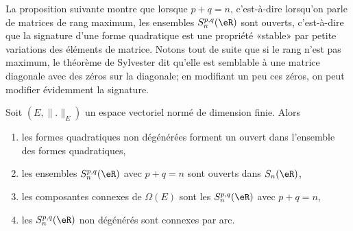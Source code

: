 La proposition suivante montre que lorsque \( p+q=n\), c'est-à-dire lorsqu'on parle de matrices de rang maximum, les ensembles \( S_n^{p,q}(\eR)\) sont ouverts, c'est-à-dire que la signature d'une forme quadratique est une propriété «stable» par petite variations des éléments de matrice. Notons tout de suite que si le rang n'est pas maximum, le théorème de Sylvester dit qu'elle est semblable à une matrice diagonale avec des zéros sur la diagonale; en modifiant un peu ces zéros, on peut modifier évidemment la signature.
\begin{proposition} \label{PropNPbnsMd}
    Soit \( (E,\| . \|_{E})\) un espace vectoriel normé de dimension finie. Alors
    \begin{enumerate}
        \item
            les formes quadratiques non dégénérées forment un ouvert dans l'ensemble des formes quadratiques,
        \item
            les ensembles \( S_n^{p,q}(\eR)\) avec \( p+q=n\) sont ouverts dans \( S_n(\eR)\),
        \item   \label{ItemGOhRIiViii}
            les composantes connexes de \( \Omega(E)\) sont les \( S_n^{p,q}(\eR)\) avec \( p+q=n\),
        \item   \label{ItemGOhRIiViv}
            les \( S_n^{p,q}(\eR)\) non dégénérés sont connexes par arc.
    \end{enumerate}
\end{proposition}

